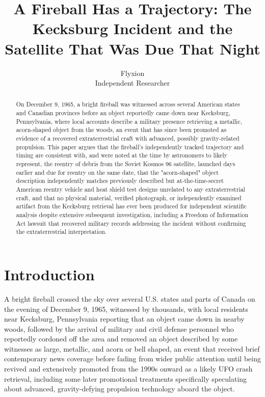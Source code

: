 \documentclass[11pt]{article}
\title{A Fireball Has a Trajectory: The Kecksburg Incident and the Satellite That Was Due That Night}
\author{Flyxion \\ \small Independent Researcher}
\date{}
\begin{document}
\maketitle

\begin{abstract}
On December 9, 1965, a bright fireball was witnessed across several American states and Canadian provinces before an object reportedly came down near Kecksburg, Pennsylvania, where local accounts describe a military presence retrieving a metallic, acorn-shaped object from the woods, an event that has since been promoted as evidence of a recovered extraterrestrial craft with advanced, possibly gravity-related propulsion. This paper argues that the fireball's independently tracked trajectory and timing are consistent with, and were noted at the time by astronomers to likely represent, the reentry of debris from the Soviet Kosmos 96 satellite, launched days earlier and due for reentry on the same date, that the "acorn-shaped" object description independently matches previously described but at-the-time-secret American reentry vehicle and heat shield test designs unrelated to any extraterrestrial craft, and that no physical material, verified photograph, or independently examined artifact from the Kecksburg retrieval has ever been produced for independent scientific analysis despite extensive subsequent investigation, including a Freedom of Information Act lawsuit that recovered military records addressing the incident without confirming the extraterrestrial interpretation.
\end{abstract}

\section{Introduction}

A bright fireball crossed the sky over several U.S. states and parts of Canada on the evening of December 9, 1965, witnessed by thousands, with local residents near Kecksburg, Pennsylvania reporting that an object came down in nearby woods, followed by the arrival of military and civil defense personnel who reportedly cordoned off the area and removed an object described by some witnesses as large, metallic, and acorn or bell shaped, an event that received brief contemporary news coverage before fading from wider public attention until being revived and extensively promoted from the 1990s onward as a likely UFO crash retrieval, including some later promotional treatments specifically speculating about advanced, gravity-defying propulsion technology aboard the object.
\end{document}
